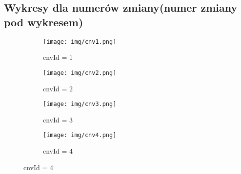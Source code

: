 \documentclass{article}
\begin{document}
\subsection{Wykresy dla numerów zmiany(numer zmiany pod wykresem)}

\begin{figure}[H]
    \centering
    \begin{subfigure}{0.48\textwidth}
        \centering
        \texttt{[image: img/cnv1.png]}
        \caption{cnvId = 1}
        \label{fig:sub1}
    \end{subfigure}
    \hfill
    \begin{subfigure}{0.48\textwidth}
        \centering
        \texttt{[image: img/cnv2.png]}
        \caption{cnvId = 2}
        \label{fig:sub2}
    \end{subfigure}
    
    \begin{subfigure}{0.48\textwidth}
        \centering
        \texttt{[image: img/cnv3.png]}
        \caption{cnvId = 3}
        \label{fig:sub3}
    \end{subfigure}
    \hfill
    \begin{subfigure}{0.48\textwidth}
        \centering
        \texttt{[image: img/cnv4.png]}
        \caption{cnvId = 4}
        \label{fig:sub4}
    \end{subfigure}
    
    \label{fig:combined}
\end{figure}
\end{document}
